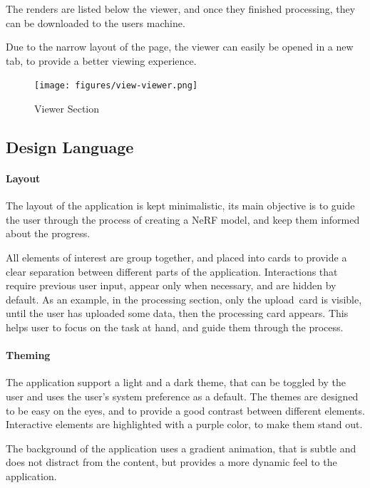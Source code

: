 The renders are listed below the viewer, and once they finished processing, they can be downloaded to the users machine.

Due to the narrow layout of the page, the viewer can easily be opened in a new tab, to provide a better viewing experience.

\begin{figure}[htb]
  \texttt{[image: figures/view-viewer.png]}
  \caption{Viewer Section}
  \label{fig:design:viewer-section}
\end{figure}

\subsection*{Design Language}

\paragraph{Layout}

The layout of the application is kept minimalistic, its main objective is to guide the user through the process of creating a NeRF model, and keep them informed about the progress.

All elements of interest are group together, and placed into cards to provide a clear separation between different parts of the application.
Interactions that require previous user input, appear only when necessary, and are hidden by default.
As an example, in the processing section, only the upload card is visible, until the user has uploaded some data, then the processing card appears.
This helps user to focus on the task at hand, and guide them through the process.

\paragraph{Theming}

The application support a light and a dark theme, that can be toggled by the user and uses the user's system preference as a default.
The themes are designed to be easy on the eyes, and to provide a good contrast between different elements.
Interactive elements are highlighted with a purple color, to make them stand out.

The background of the application uses a gradient animation, that is subtle and does not distract from the content, but provides a more dynamic feel to the application.
